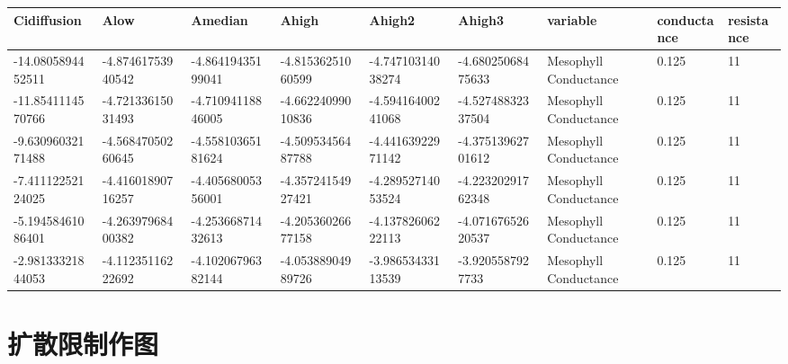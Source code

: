 \documentclass[
]{krantz}
\begin{document}
\begin{tabular}{l|l|l|l|l|l|l|l|l}
\hline
Cidiffusion & Alow & Amedian & Ahigh & Ahigh2 & Ahigh3 & variable & conductance & resistance\\
\hline
-14.0805894452511 & -4.87461753940542 & -4.86419435199041 & -4.81536251060599 & -4.74710314038274 & -4.68025068475633 & Mesophyll Conductance & 0.125 & 11\\
\hline
-11.8541114570766 & -4.72133615031493 & -4.71094118846005 & -4.66224099010836 & -4.59416400241068 & -4.52748832337504 & Mesophyll Conductance & 0.125 & 11\\
\hline
-9.63096032171488 & -4.56847050260645 & -4.55810365181624 & -4.50953456487788 & -4.44163922971142 & -4.37513962701612 & Mesophyll Conductance & 0.125 & 11\\
\hline
-7.41112252124025 & -4.41601890716257 & -4.40568005356001 & -4.35724154927421 & -4.28952714053524 & -4.22320291762348 & Mesophyll Conductance & 0.125 & 11\\
\hline
-5.19458461086401 & -4.26397968400382 & -4.25366871432613 & -4.20536026677158 & -4.13782606222113 & -4.07167652620537 & Mesophyll Conductance & 0.125 & 11\\
\hline
-2.98133321844053 & -4.11235116222692 & -4.10206796382144 & -4.05388904989726 & -3.98653433113539 & -3.9205587927733 & Mesophyll Conductance & 0.125 & 11\\
\hline
\end{tabular}

\hypertarget{multi13}{%
\section{扩散限制作图}\label{multi13}}
\end{document}
